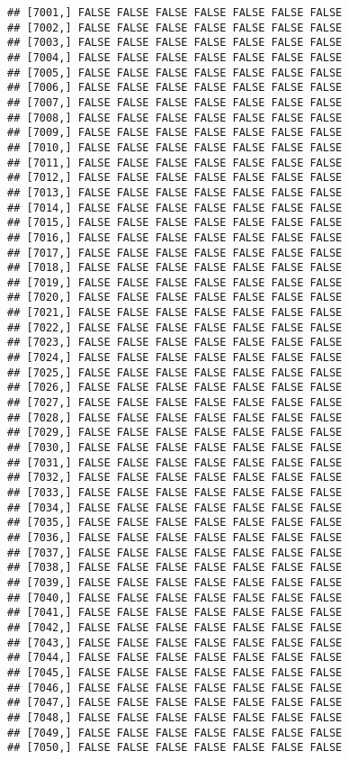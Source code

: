 \documentclass[
]{article}
\begin{document}
\begin{verbatim}
## [7001,] FALSE FALSE FALSE FALSE FALSE FALSE FALSE
## [7002,] FALSE FALSE FALSE FALSE FALSE FALSE FALSE
## [7003,] FALSE FALSE FALSE FALSE FALSE FALSE FALSE
## [7004,] FALSE FALSE FALSE FALSE FALSE FALSE FALSE
## [7005,] FALSE FALSE FALSE FALSE FALSE FALSE FALSE
## [7006,] FALSE FALSE FALSE FALSE FALSE FALSE FALSE
## [7007,] FALSE FALSE FALSE FALSE FALSE FALSE FALSE
## [7008,] FALSE FALSE FALSE FALSE FALSE FALSE FALSE
## [7009,] FALSE FALSE FALSE FALSE FALSE FALSE FALSE
## [7010,] FALSE FALSE FALSE FALSE FALSE FALSE FALSE
## [7011,] FALSE FALSE FALSE FALSE FALSE FALSE FALSE
## [7012,] FALSE FALSE FALSE FALSE FALSE FALSE FALSE
## [7013,] FALSE FALSE FALSE FALSE FALSE FALSE FALSE
## [7014,] FALSE FALSE FALSE FALSE FALSE FALSE FALSE
## [7015,] FALSE FALSE FALSE FALSE FALSE FALSE FALSE
## [7016,] FALSE FALSE FALSE FALSE FALSE FALSE FALSE
## [7017,] FALSE FALSE FALSE FALSE FALSE FALSE FALSE
## [7018,] FALSE FALSE FALSE FALSE FALSE FALSE FALSE
## [7019,] FALSE FALSE FALSE FALSE FALSE FALSE FALSE
## [7020,] FALSE FALSE FALSE FALSE FALSE FALSE FALSE
## [7021,] FALSE FALSE FALSE FALSE FALSE FALSE FALSE
## [7022,] FALSE FALSE FALSE FALSE FALSE FALSE FALSE
## [7023,] FALSE FALSE FALSE FALSE FALSE FALSE FALSE
## [7024,] FALSE FALSE FALSE FALSE FALSE FALSE FALSE
## [7025,] FALSE FALSE FALSE FALSE FALSE FALSE FALSE
## [7026,] FALSE FALSE FALSE FALSE FALSE FALSE FALSE
## [7027,] FALSE FALSE FALSE FALSE FALSE FALSE FALSE
## [7028,] FALSE FALSE FALSE FALSE FALSE FALSE FALSE
## [7029,] FALSE FALSE FALSE FALSE FALSE FALSE FALSE
## [7030,] FALSE FALSE FALSE FALSE FALSE FALSE FALSE
## [7031,] FALSE FALSE FALSE FALSE FALSE FALSE FALSE
## [7032,] FALSE FALSE FALSE FALSE FALSE FALSE FALSE
## [7033,] FALSE FALSE FALSE FALSE FALSE FALSE FALSE
## [7034,] FALSE FALSE FALSE FALSE FALSE FALSE FALSE
## [7035,] FALSE FALSE FALSE FALSE FALSE FALSE FALSE
## [7036,] FALSE FALSE FALSE FALSE FALSE FALSE FALSE
## [7037,] FALSE FALSE FALSE FALSE FALSE FALSE FALSE
## [7038,] FALSE FALSE FALSE FALSE FALSE FALSE FALSE
## [7039,] FALSE FALSE FALSE FALSE FALSE FALSE FALSE
## [7040,] FALSE FALSE FALSE FALSE FALSE FALSE FALSE
## [7041,] FALSE FALSE FALSE FALSE FALSE FALSE FALSE
## [7042,] FALSE FALSE FALSE FALSE FALSE FALSE FALSE
## [7043,] FALSE FALSE FALSE FALSE FALSE FALSE FALSE
## [7044,] FALSE FALSE FALSE FALSE FALSE FALSE FALSE
## [7045,] FALSE FALSE FALSE FALSE FALSE FALSE FALSE
## [7046,] FALSE FALSE FALSE FALSE FALSE FALSE FALSE
## [7047,] FALSE FALSE FALSE FALSE FALSE FALSE FALSE
## [7048,] FALSE FALSE FALSE FALSE FALSE FALSE FALSE
## [7049,] FALSE FALSE FALSE FALSE FALSE FALSE FALSE
## [7050,] FALSE FALSE FALSE FALSE FALSE FALSE FALSE

\end{verbatim}
\end{document}

